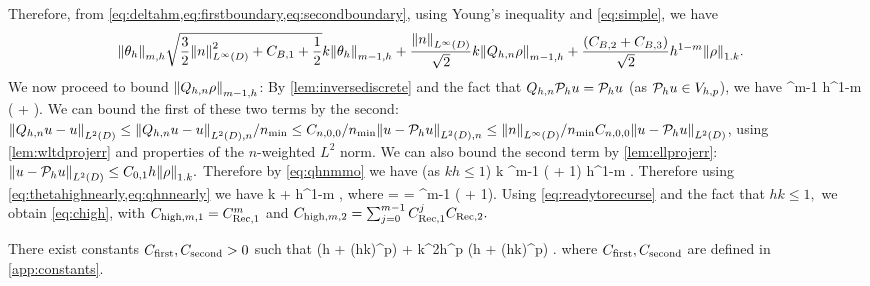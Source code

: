 Therefore, from \cref{eq:deltahm,eq:firstboundary,eq:secondboundary}, using Young's inequality and \cref{eq:simple}, we have
\begin{align}\label{eq:thetahighnearly}
\Nfn{m,h}{\thetah} &\sqrt{\frac32 \NLiD{n}^2 + \CBo + \half} k  \Nfn{m-1,h}{\thetah} + \frac{\NLiD{n}}{\sqrt{2}} k \Nfn{m-1,h}{\Qhn \rho} + \frac{\mleft(\CBt + \CBth\mright)}{\sqrt{2}} h^{1-m} \NW{\rho}.
\end{align}
We now proceed to bound $\Nfn{m-1,h}{\Qhn \rho}$: By \cref{lem:inversediscrete} and the fact that $Q_{h,n} \mathcal P_{h} u = \mathcal P_{h} u$ (as $\mathcal P_{h} u \in V_{h,p}$), we have
\beq\label{eq:qhnmmo}
 \leq \Chinv^{m-1} h^{1-m} \mleft( + \mright).
\eeq
We can bound the first of these two terms by the second: $\NLtD{\Qhn u - u} \leq \NLtDn{\Qhn u - u}/\nmin \leq \Cfn{n,0,0}/\nmin \NLtDn{u - \Ph u} \leq \NLiD{n}/\nmin \Cfn{n,0,0} \NLtD{u-\Ph u}$, using \cref{lem:wltdprojerr} and properties of the $n$-weighted $L^2$ norm. We can also bound the second term by \cref{lem:ellprojerr}: $\NLtD{u - \Ph u} \leq \Cfn{0,1} h \NW{\rho}.$ Therefore by \cref{eq:qhnmmo} we have (as $kh \leq 1$)
\beq\label{eq:qhnnearly}
k  \leq \Chinv^{m-1} \mleft(  + 1\mright)  h^{1-m} \NW{\rho}.
\eeq
Therefore using \cref{eq:thetahighnearly,eq:qhnnearly} we have
\beq\label{eq:readytorecurse}
 \leq \CReco k  + \CRect h^{1-m} \NW{\rho},
\eeq
where
\beqs
\CReco =  \tand \CRect =  \Chinv^{m-1} \mleft(  + 1\mright).
\eeqs
Using \cref{eq:readytorecurse} and the fact that $hk \leq 1,$ we obtain \cref{eq:chigh}, with $C_{\mathrm{high},m,1} = C_{\mathrm{Rec},1}^m$ and $C_{\mathrm{high},m,2} = \sum_{j=0}^{m-1} C_{\mathrm{Rec},1}^j C_{\mathrm{Rec},2}.$
\epf

\label{lem:ltthetahbound}
There exist constants $C_{\mathrm{first}}, C_{\mathrm{second}} > 0$ such that
\beq\label{eq:ltthetahbound}
\NLtD{\thetah} \leq \Cfirst \mleft(\CFEMotilde h + \CFEMttilde \CAnk (hk)^p\mright) \NW{\rho} + \Csecond k^2h^p \mleft(\CFEMotilde h + \CFEMttilde \CAnk (hk)^p\mright) .
\eeq
where $C_{\mathrm{first}}, C_{\mathrm{second}}$ are defined in \cref{app:constants}.
\ele

